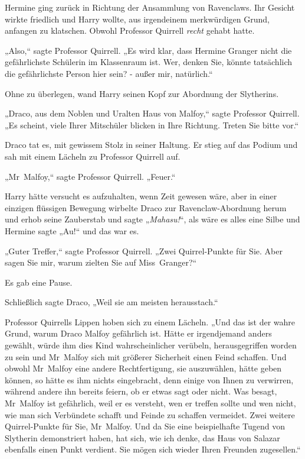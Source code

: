 {Hermine ging zurück in Richtung der Ansammlung von Ravenclaws. Ihr Gesicht wirkte friedlich und Harry wollte, aus irgendeinem merkwürdigen Grund, anfangen zu klatschen. Obwohl Professor Quirrell \emph{recht} gehabt hatte.

„Also,“ sagte Professor Quirrell. „Es wird klar, dass Hermine Granger nicht die gefährlichste Schülerin im Klassenraum ist. Wer, denken Sie, könnte tatsächlich die gefährlichste Person hier sein? - außer mir, natürlich.“

Ohne zu überlegen, wand Harry seinen Kopf zur Abordnung der Slytherins.

„Draco, aus dem Noblen und Uralten Haus von Malfoy,“ sagte Professor Quirrell. „Es scheint, viele Ihrer Mitschüler blicken in Ihre Richtung. Treten Sie bitte vor.“

Draco tat es, mit gewissem Stolz in seiner Haltung. Er stieg auf das Podium und sah mit einem Lächeln zu Professor Quirrell auf.

„Mr~Malfoy,“ sagte Professor Quirrell. „Feuer.“

Harry hätte versucht es aufzuhalten, wenn Zeit gewesen wäre, aber in einer einzigen flüssigen Bewegung wirbelte Draco zur Ravenclaw-Abordnung herum und erhob seine Zauberstab und sagte „\emph{Mahasu!}“, als wäre es alles eine Silbe und Hermine sagte „Au!“ und das war es.

„Guter Treffer,“ sagte Professor Quirrell. „Zwei Quirrel-Punkte für Sie. Aber sagen Sie mir, warum zielten Sie auf Miss~Granger?“

Es gab eine Pause.

Schließlich sagte Draco, „Weil sie am meisten herausstach.“

Professor Quirrells Lippen hoben sich zu einem Lächeln. „Und das ist der wahre Grund, warum Draco Malfoy gefährlich ist. Hätte er irgendjemand anders gewählt, würde ihm dies Kind wahrscheinlicher verübeln, herausgegriffen worden zu sein und Mr~Malfoy sich mit größerer Sicherheit einen Feind schaffen. Und obwohl Mr~Malfoy eine andere Rechtfertigung, sie auszuwählen, hätte geben können, so hätte es ihm nichts eingebracht, denn einige von Ihnen zu verwirren, während andere ihn bereits feiern, ob er etwas sagt oder nicht. Was besagt, Mr~Malfoy ist gefährlich, weil er es versteht, wen er treffen sollte und wen nicht, wie man sich Verbündete schafft und Feinde zu schaffen vermeidet. Zwei weitere Quirrel-Punkte für Sie, Mr~Malfoy. Und da Sie eine beispielhafte Tugend von Slytherin demonstriert haben, hat sich, wie ich denke, das Haus von Salazar ebenfalls einen Punkt verdient. Sie mögen sich wieder Ihren Freunden zugesellen.“

}
